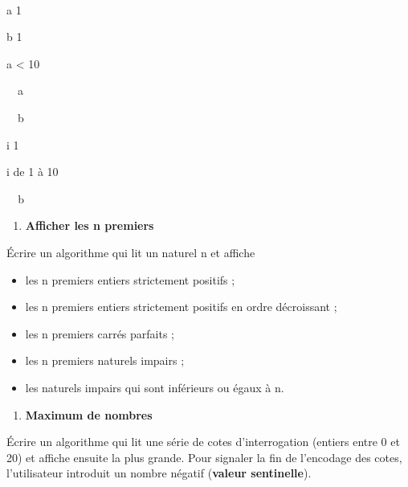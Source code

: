 {\sffamily
{\ \ }}

{\sffamily
{}}


\bigskip

{\sffamily
a  1}

{\sffamily
b  1}

{\sffamily
{} a {\textless} 10 }

{\sffamily
\ \ {a
}}

{\sffamily
{\ \ b
}}

{\sffamily
{}}

{\sffamily
{}}


\bigskip

{\sffamily
i  1}

{\sffamily
{} i de 1 à 10 }

{\sffamily
{\texttt{\ \ }}{b}{\texttt{
}}}

{\sffamily
{}}


\bigskip

\liststyleExercice
\setcounter{saveenum}{\value{enumi}}
\begin{enumerate}
\setcounter{enumi}{\value{saveenum}}
\item {\sffamily\bfseries
Afficher les n premiers}
\end{enumerate}
{
Écrire un algorithme qui lit un naturel n et affiche}

\begin{itemize}
\item {
les n premiers entiers strictement positifs ;}
\item {
les n premiers entiers strictement positifs en ordre décroissant ;}
\item {
les n premiers carrés parfaits ;}
\item {
les n premiers naturels impairs ;}
\item {
les naturels impairs qui sont inférieurs ou égaux à n.}
\end{itemize}
\liststyleExercice
\begin{enumerate}
\item {\sffamily\bfseries
Maximum de nombres}
\end{enumerate}
{
Écrire un algorithme qui lit une série de cotes d’interrogation (entiers
entre 0 et 20) et affiche ensuite la plus grande. Pour signaler la fin
de l’encodage des cotes, l’utilisateur introduit un nombre négatif
(\textbf{valeur sentinelle}).}

